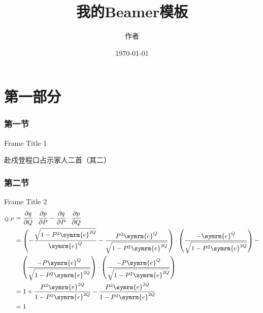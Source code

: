 \documentclass{beamer}
\title{我的Beamer模板}
\author{作者}
\date{\today}
\begin{document}
\begin{frame}
    \titlepage
\end{frame}

\part{第一部分}

\begin{frame}
    \partpage
    \tableofcontents
\end{frame}

\section{第一节}

\begin{frame}{Frame Title 1}
    \begin{center}
        赴戍登程口占示家人二首（其二）
        \medskip

        \bigskip

    \end{center}
\end{frame}

\section{第二节}

\begin{frame}{Frame Title 2}
    \begin{align*}
        [q,p]_{Q,P}
        &= \frac{\partial q}{\partial Q}\cdot\frac{\partial p}{\partial P} - \frac{\partial q}{\partial P}\cdot\frac{\partial p}{\partial Q} \\
        &= \left(-\frac{\sqrt{1-P^2\symrm{e}^{2Q}}}{\symrm{e}^Q} - \frac{P^2\symrm{e}^Q}{\sqrt{1-P^2\symrm{e}^{2Q}}}\right)\cdot\left(\frac{-\symrm{e}^Q}{\sqrt{1-P^2\symrm{e}^{2Q}}}\right) - \\
        &\quad\left(\frac{-P\symrm{e}^Q}{\sqrt{1-P^2\symrm{e}^{2Q}}}\right)\cdot\left(\frac{-P\symrm{e}^Q}{\sqrt{1-P^2\symrm{e}^{2Q}}}\right) \\
        &= 1 + \frac{P^2\symrm{e}^{2Q}}{1-P^2\symrm{e}^{2Q}} - \frac{P^2\symrm{e}^{2Q}}{1-P^2\symrm{e}^{2Q}} \\
        &= 1
    \end{align*}
\end{frame}
\end{document}
